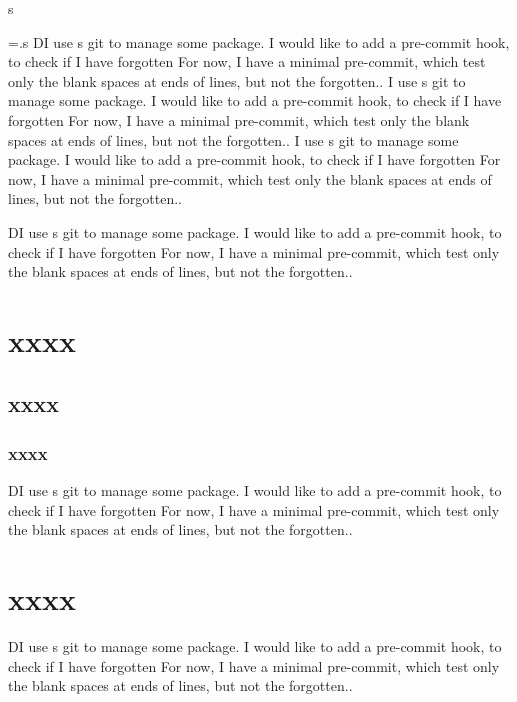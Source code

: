\documentclass[a4paper, oneside, notitlepage, 12pt]{article}
\begin{document}
\def\print@lsection{%
    \add@inserts\affixside@note%
    \@nobreakfalse\csuse{l@section@\the\c@pstart}\hspace{\paperwidth}{\new@line \l@dunhbox@line{\one@line}}%
    \vskip-\baselineskip%
}



s
\newpage
\beginnumbering

\immediate\openout\l@sec@out=\jobname.s
\pstart
DI use s git to manage some package.
I would like to add a pre-commit hook, to check if I have forgotten
For now, I have a minimal pre-commit, which test only the blank spaces at ends of lines, but not the forgotten..
\pend
\pstart
{}
\pend
\pstart
{}
\pend
\pstart
{}
\pend
\pstart
{}I use s git to manage some package.
I would like to add a pre-commit hook, to check if I have forgotten
For now, I have a minimal pre-commit, which test only the blank spaces at ends of lines, but not the forgotten..
\pend
\pstart
{}
\pend
\pstart
{}I use s git to manage some package.
I would like to add a pre-commit hook, to check if I have forgotten
For now, I have a minimal pre-commit, which test only the blank spaces at ends of lines, but not the forgotten..
\pend
\immediate\closeout\l@sec@out

\endnumbering
\newpage


DI use s git to manage some package.
I would like to add a pre-commit hook, to check if I have forgotten
For now, I have a minimal pre-commit, which test only the blank spaces at ends of lines, but not the forgotten..
\section{xxxx}
\subsection{xxxx}
\subsubsection{xxxx}
DI use s git to manage some package.
I would like to add a pre-commit hook, to check if I have forgotten
For now, I have a minimal pre-commit, which test only the blank spaces at ends of lines, but not the forgotten..
\section{xxxx}

DI use s git to manage some package.
I would like to add a pre-commit hook, to check if I have forgotten
For now, I have a minimal pre-commit, which test only the blank spaces at ends of lines, but not the forgotten..
\end{document}

